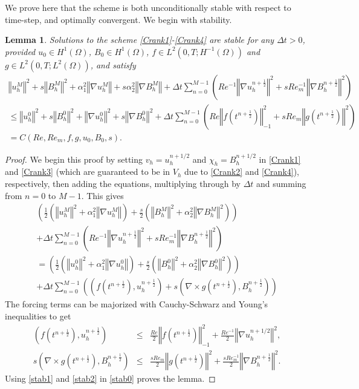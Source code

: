 \documentclass[11pt]{article}%
\numberwithin{equation}{section}
\newcommand{\norm}[1]{\left\Vert#1\right\Vert}
\newtheorem{lem}{Lemma}[section]
\def\grad{{\nabla}}
\begin{document}
We prove here that the scheme is both unconditionally stable with respect to time-step, and optimally
convergent.  We begin with stability.

\begin{lem}
Solutions to the scheme \eqref{Crank1}-\eqref{Crank4} are stable for any $\Delta t>0$, provided $u_0 \in H^1(\Omega)$, 
$B_0\in H^1(\Omega)$, $f\in L^{2}(0,T;H^{-1}(\Omega))$ and $g\in L^{2}(0,T;L^{2}(\Omega))$, and satisfy
\begin{multline}
\norm{ u_{h}^{M}}^{2}+s\norm{B_{h}^{M}}^{2}+\alpha_1^2\norm{ \nabla u_{h}^{M} }+s\alpha_2^2 \norm{ \nabla B_{h}^{M} }
+\Delta t\sum_{n=0}^{M-1}{\left(Re^{-1}\norm{\nabla u_{h}^{n+\frac{1}{2}}}^{2}
+sRe_{m}^{-1}\norm{\nabla B_{h}^{n+\frac{1}{2}}}^{2}\right)} \\
\le
\norm{u_{h}^{0}}^{2}+s\norm{B_{h}^{0}}^{2} +\norm{\grad{u}_{h}^{0}}^{2}+s\norm{\grad{B}_{h}^{0}}^{2}
+\Delta t\sum_{n=0}^{M-1}{\left(
Re\norm{f(t^{n+\frac{1}{2}})}_{-1}^2 + sRe_m\norm{g(t^{n+\frac{1}{2}})}^2
\right)}\\ = C(Re,Re_m,f,g,u_0,B_0,s).
\end{multline}
\end{lem}
\begin{proof}
We begin this proof by setting $v_h=u_h^{n+1/2}$ and $\chi_h=B_h^{n+1/2}$ in \eqref{Crank1} and \eqref{Crank3} (which
are guaranteed to be in $V_h$ due to \eqref{Crank2} and \eqref{Crank4}), respectively, then adding the equations, multiplying through by $\Delta t$ and summing from $n=0$ to $M-1$.  This gives
\begin{multline}
\left(\frac12\left(\norm{ u_{h}^{M}}^{2}+\alpha_1^2\norm{\nabla u_{h}^{M}}\right)+\frac{s}{2}\left(\norm{B_{h}^{M}}^{2}+\alpha_2^2\norm{\nabla B_{h}^{M}}^{2}\right)\right)\\
+\Delta t\sum_{n=0}^{M-1}{\left(Re^{-1}\norm{\nabla u_{h}^{n+\frac{1}{2}}}^{2}
+sRe_{m}^{-1}\norm{\nabla B_{h}^{n+\frac{1}{2}}}^{2}\right)} \\
=
\left(\frac12\left(\norm{ u_{h}^{0}}^{2}+\alpha_1^2\norm{\nabla u_{h}^{0}}\right)+\frac{s}{2}\left(\norm{B_{h}^{0}}^{2}+\alpha_2^2\norm{\nabla B_{h}^{0}}^{2}\right)\right)\\
+\Delta t\sum_{n=0}^{M-1}{\left( (f(t^{n+\frac{1}{2}}),u_{h}^{n+\frac{1}{2}})
+s(\nabla\times g(t^{n+\frac{1}{2}}),B_{h}^{n+\frac{1}{2}})\right)} \label{stab0}
\end{multline}
The forcing terms can be majorized with Cauchy-Schwarz and Young's inequalities to get
\begin{eqnarray}
(f(t^{n+\frac{1}{2}}),u_{h}^{n+\frac{1}{2}})
& \le & 
\frac{Re}{2}\norm{f(t^{n+\frac{1}{2}})}_{-1}^2 + \frac{Re^{-1}}{2}\norm{\nabla u_h^{n+1/2}}^{2}, \label{stab1} \\
s(\nabla\times g(t^{n+\frac{1}{2}}),B_{h}^{n+\frac{1}{2}})
& \le &
\frac{sRe_m}{2}\norm{g(t^{n+\frac{1}{2}})}^2 + \frac{sRe^{-1}_{m}}{2}\norm{\nabla B_{h}^{n+\frac{1}{2}}}^2. \label{stab2}
\end{eqnarray}
Using \eqref{stab1} and \eqref{stab2} in \eqref{stab0} proves the lemma.
\end{proof}
\end{document}
